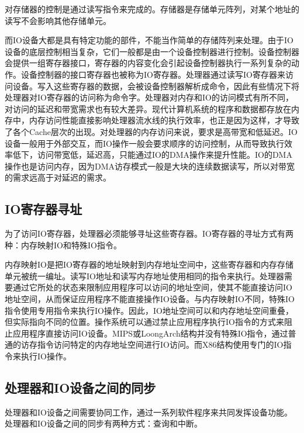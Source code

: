 \documentclass[]{ctexbook}
\begin{document}
对存储器的控制是通过读写指令来完成的。存储器是存储单元阵列，对某个地址的读写不会影响其他存储单元。

而IO设备大都是具有特定功能的部件，不能当作简单的存储阵列来处理。由于IO设备的底层控制相当复杂，它们一般都是由一个设备控制器进行控制。设备控制器会提供一组寄存器接口，寄存器的内容变化会引起设备控制器执行一系列复杂的动作。设备控制器的接口寄存器也被称为IO寄存器。处理器通过读写IO寄存器来访问设备。写入这些寄存器的数据，会被设备控制器解析成命令，因此有些情况下将处理器对IO寄存器的访问称为命令字。处理器对内存和IO的访问模式有所不同，对访问的延迟和带宽需求也有较大差异。现代计算机系统的程序和数据都存放在内存中，内存访问性能直接影响处理器流水线的执行效率，也正是因为这样，才导致了各个Cache层次的出现。对处理器的内存访问来说，要求是高带宽和低延迟。IO设备一般用于外部交互，而IO操作一般会要求顺序的访问控制，从而导致执行效率低下，访问带宽低，延迟高，只能通过IO的DMA操作来提升性能。IO的DMA操作也是访问内存，因为DMA访存模式一般是大块的连续数据读写，所以对带宽的需求远高于对延迟的需求。

\hypertarget{ioux5bc4ux5b58ux5668ux5bfbux5740}{%
\subsection{IO寄存器寻址}\label{ioux5bc4ux5b58ux5668ux5bfbux5740}}

为了访问IO寄存器，处理器必须能够寻址这些寄存器。IO寄存器的寻址方式有两种：内存映射IO和特殊IO指令。

内存映射IO是把IO寄存器的地址映射到内存地址空间中，这些寄存器和内存存储单元被统一编址。读写IO地址和读写内存地址使用相同的指令来执行。处理器需要通过它所处的状态来限制应用程序可以访问的地址空间，使其不能直接访问IO地址空间，从而保证应用程序不能直接操作IO设备。与内存映射IO不同，特殊IO指令使用专用指令来执行IO操作。因此，IO地址空间可以和内存地址空间重叠，但实际指向不同的位置。操作系统可以通过禁止应用程序执行IO指令的方式来阻止应用程序直接访问IO设备。MIPS或LoongArch结构并没有特殊IO指令，通过普通的访存指令访问特定的内存地址空间进行IO访问。而X86结构使用专门的IO指令来执行IO操作。

\hypertarget{ux5904ux7406ux5668ux548cioux8bbeux5907ux4e4bux95f4ux7684ux540cux6b65}{%
\subsection{处理器和IO设备之间的同步}\label{ux5904ux7406ux5668ux548cioux8bbeux5907ux4e4bux95f4ux7684ux540cux6b65}}

处理器和IO设备之间需要协同工作，通过一系列软件程序来共同发挥设备功能。处理器和IO设备之间的同步有两种方式：查询和中断。
\end{document}
